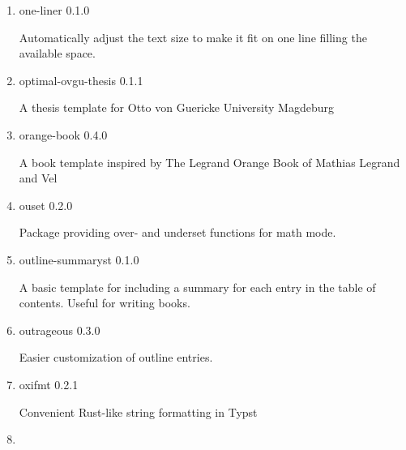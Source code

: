 \begin{enumerate}
  { ofbnote } { 0.2.0 }

  A document template using French Office for biodiversity design
  guidelines
\item
  \href{/universe/package/one-liner/}{}

  { one-liner } { 0.1.0 }

  Automatically adjust the text size to make it fit on one line filling
  the available space.
\item
  \href{/universe/package/optimal-ovgu-thesis/}{}


  { optimal-ovgu-thesis } { 0.1.1 }

  A thesis template for Otto von Guericke University Magdeburg
\item
  \href{/universe/package/orange-book/}{}


  { orange-book } { 0.4.0 }

  A book template inspired by The Legrand Orange Book of Mathias Legrand
  and Vel
\item
  \href{/universe/package/ouset/}{}

  { ouset } { 0.2.0 }

  Package providing over- and underset functions for math mode.
\item
  \href{/universe/package/outline-summaryst/}{}

  { outline-summaryst } { 0.1.0 }

  A basic template for including a summary for each entry in the table
  of contents. Useful for writing books.
\item
  \href{/universe/package/outrageous/}{}

  { outrageous } { 0.3.0 }

  Easier customization of outline entries.
\item
  \href{/universe/package/oxifmt/}{}

  { oxifmt } { 0.2.1 }

  Convenient Rust-like string formatting in Typst
\item
  \href{/universe/package/paddling-tongji-thesis/}{}



\end{enumerate}

